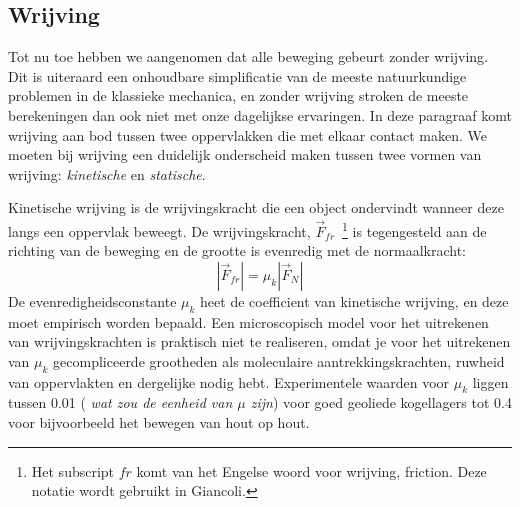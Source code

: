 \subsection{Wrijving}\label{sec:wrijving}

Tot nu toe hebben we aangenomen dat alle beweging gebeurt zonder wrijving. Dit is
uiteraard een onhoudbare simplificatie van de meeste natuurkundige problemen in 
de klassieke mechanica, en zonder wrijving stroken de meeste berekeningen dan ook niet
met onze dagelijkse ervaringen. In deze paragraaf komt wrijving aan bod tussen twee
oppervlakken die met elkaar contact maken. We moeten bij wrijving een duidelijk
onderscheid maken tussen twee vormen van wrijving: {\it kinetische} en {\it statische}. 

Kinetische wrijving is de wrijvingskracht die een object ondervindt wanneer deze
langs een oppervlak beweegt. De wrijvingskracht, $\vec{F}_{fr}$~\footnote{Het subscript
$fr$ komt van het Engelse woord voor wrijving, friction. Deze notatie wordt gebruikt in
Giancoli.} is tegengesteld aan de richting van de beweging en de grootte is evenredig 
met de normaalkracht:
\begin{equation}
|\vec{F}_{fr}| = \mu_{k} |\vec{F}_N|
\end{equation}
De evenredigheidsconstante $\mu_k$ heet de coefficient van kinetische wrijving, en deze
moet empirisch worden bepaald. Een microscopisch model voor het uitrekenen van 
wrijvingskrachten is praktisch niet te realiseren, omdat je voor het uitrekenen van $\mu_k$ 
gecompliceerde grootheden als moleculaire aantrekkingskrachten, ruwheid van oppervlakten 
en dergelijke nodig hebt. Experimentele waarden voor $\mu_k$ liggen tussen 0.01 ({\it
wat zou de eenheid van $\mu$ zijn}) voor goed geoliede kogellagers tot 0.4 voor
bijvoorbeeld het bewegen van hout op hout.

